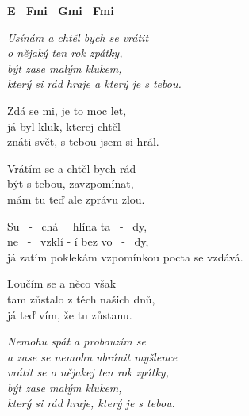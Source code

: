 
\re{}
\begin{footnotesize}
\textbf{E \ F\guitarSharp{}mi \ G\guitarSharp{}mi \ F\guitarSharp{}mi}
\end{footnotesize}

\textit{Usínám a chtěl bych se vrátit\\
o nějaký ten rok zpátky,\\
být zase malým klukem,\\
který si rád hraje a který je s tebou.}

\ve{}
Zdá se mi, je to moc let,\\
já byl kluk, kterej chtěl\\
znáti svět, s tebou jsem si hrál.

\ve{}
Vrátím se a chtěl bych rád\\
být s tebou, zavzpomínat,\\
mám tu teď ale zprávu zlou.

\cho{}
Su \ - \ chá \ \ hlína ta \ - \ dy,\\
ne \ - \ vzklí - í bez vo \ - \ dy,\\
já zatím poklekám vzpomínkou pocta se vzdává.

\ve{}
Loučím se a něco však\\
tam zůstalo z těch našich dnů,\\
já teď vím, že tu zůstanu.

\textit{Nemohu spát a probouzím se\\
a zase se nemohu ubránit myšlence\\
vrátit se o nějakej ten rok zpátky,\\
být zase malým klukem,\\
který si rád hraje, který je s tebou.}

\esong